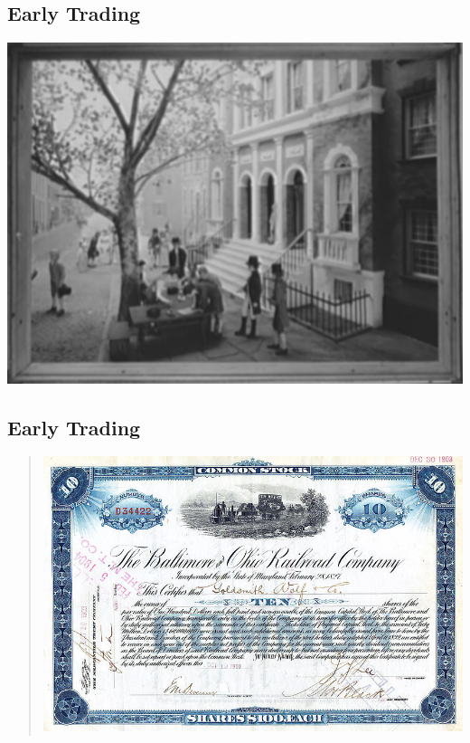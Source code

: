 \documentclass[letterpaper,10pt,english]{sphinxmanual}
\begin{document}
\subsection{Early Trading}
\label{trading:id1}
\includegraphics[width=6in]{buttonwood.png}


\subsection{Early Trading}
\label{trading:id2}\begin{quote}

{\hfill\includegraphics[width=7.5in]{stockCertificate.png}\hfill}
\end{quote}
\end{document}
